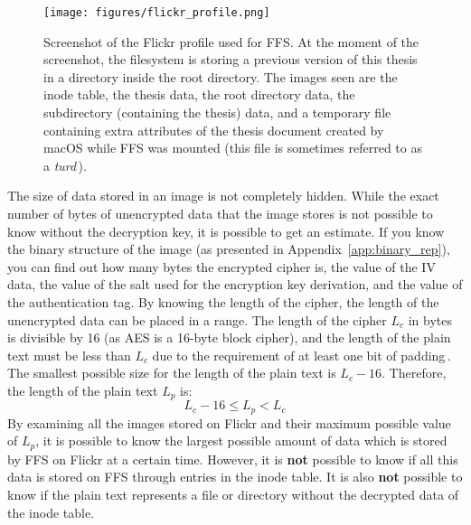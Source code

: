 \begin{figure}[!ht]
	\begin{center}
	  \texttt{[image: figures/flickr\_profile.png]}
	\end{center}
	\caption[Screenshot of the Flickr profile used for FFS]{Screenshot of the Flickr profile used for FFS. At the moment of the screenshot, the filesystem is storing a previous version of this thesis in a directory inside the root directory. The images seen are the inode table, the thesis data, the root directory data, the subdirectory (containing the thesis) data, and a temporary file containing extra attributes of the thesis document created by macOS while FFS was mounted (this file is sometimes referred to as a \textit{turd}\,\cite{geekosaurAnswerWhyAre2011}).}
	\label{fig:flickr_profile}
\end{figure}

The size of data stored in an image is not completely hidden. While the exact number of bytes of unencrypted data that the image stores is not possible to know without the decryption key, it is possible to get an estimate. If you know the binary structure of the image (as presented in Appendix~\ref{app:binary_rep}), you can find out how many bytes the encrypted cipher is, the value of the IV data, the value of the salt used for the encryption key derivation, and the value of the authentication tag. By knowing the length of the cipher, the length of the unencrypted data can be placed in a range. The length of the cipher $L_c$ in bytes is divisible by 16 (as AES is a 16-byte block cipher), and the length of the plain text must be less than $L_c$ due to the requirement of at least one bit of padding\,\cite{z.z.coderAnswerSizeData2010}. The smallest possible size for the length of the plain text is $L_c - 16$. Therefore, the length of the plain text $L_p$ is:
$$
	L_c - 16 \leq L_p < L_c
$$
By examining all the images stored on Flickr and their maximum possible value of $L_p$, it is possible to know the largest possible amount of data which is stored by FFS on Flickr at a certain time. However, it is \textbf{not} possible to know if all this data is stored on FFS through entries in the inode table. It is also \textbf{not} possible to know if the plain text represents a file or directory without the decrypted data of the inode table.

